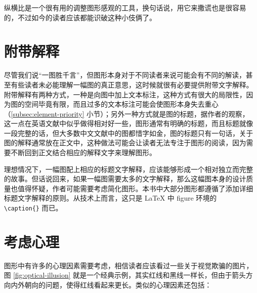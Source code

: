 \documentclass[
  b5paper,
  UTF8,twoside]{book}
\begin{document}
纵横比是一个很有用的调整图形感观的工具，换句话说，用它来撒谎也是很容易的，不过如今的读者应该都能识破这种小伎俩了。

\section{附带解释}\label{ux9644ux5e26ux89e3ux91ca}

尽管我们说``一图胜千言''，但图形本身对于不同读者来说可能会有不同的解读，甚至有些读者未必能理解一幅图的真正意思，这时候就很有必要提供附带文字解释。附带解释有两种方式，一种是向图中加上文本标注，这种方式有很大的局限性，因为图的空间毕竟有限，而且过多的文本标注可能会使图形本身失去重心（\ref{subsec:element-priority} 小节）；另外一种方式就是图的标题，据作者的观察，这一点在英语文献中似乎做得相对好一些，图形通常有明确的标题，而且标题就像一段完整的话，但大多数中文文献中的图都惜字如金，图的标题只有一句话，关于图的解释通常放在正文中，这种做法可能会让读者无法专注于图形的阅读，因为需要不断回到正文结合相应的解释文字来理解图形。

理想情况下，一幅图配上相应的标题文字解释，应该能够形成一个相对独立而完整的故事。但话说回来，如果一幅图需要太多的文字解释，那么这幅图本身的设计质量也值得怀疑，作者可能需要考虑简化图形。本书中大部分图形都遵循了添加详细标题文字解释的原则。从技术上而言，这只是 LaTeX 中 figure 环境的 \texttt{\textbackslash{}caption\{\}} 而已。

\section{考虑心理}\label{sec:psychology}

图形中有许多的心理因素需要考虑，相信读者应该看过一些关于视觉欺骗的图片，图 \ref{fig:optical-illusion} 就是一个经典示例，其实红线和黑线一样长，但由于箭头方向内外朝向的问题，使得红线看起来更长。类似的心理因素还包括：
\end{document}
